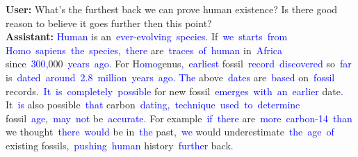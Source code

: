 \begin{tcolorbox}[colframe=gray!70!black,colback=white, title=Sample 5]
\textbf{User:}
What's the furthest back we can prove human existence? Is there good reason to believe it goes further then this point? \vspace{0.1in}
\\
\textbf{Assistant:}
\textcolor{blue}{Human} is an\textcolor{blue}{~ever}\textcolor{blue}{-ev}\textcolor{blue}{olving}\textcolor{blue}{~species}. If\textcolor{blue}{~we}\textcolor{blue}{~starts}\textcolor{blue}{~from} \textcolor{blue}{H}\textcolor{blue}{omo}\textcolor{blue}{~sapi}\textcolor{blue}{ens}\textcolor{blue}{~the}\textcolor{blue}{~species},\textcolor{blue}{~there} are\textcolor{blue}{~traces}\textcolor{blue}{~of}\textcolor{blue}{~human} in\textcolor{blue}{~Africa} since\textcolor{blue}{~}\textcolor{blue}{300}\textcolor{blue}{,}000\textcolor{blue}{~years}\textcolor{blue}{~ago}\textcolor{blue}{.} For H\textcolor{blue}{omo}genus\textcolor{blue}{,}\textcolor{blue}{~earliest} fossil\textcolor{blue}{~record}\textcolor{blue}{~discovered} so\textcolor{blue}{~far} is\textcolor{blue}{~dated}\textcolor{blue}{~around}\textcolor{blue}{~}\textcolor{blue}{2}\textcolor{blue}{.}\textcolor{blue}{8}\textcolor{blue}{~million}\textcolor{blue}{~years}\textcolor{blue}{~ago}\textcolor{blue}{.
}\textcolor{blue}{The} above\textcolor{blue}{~dates} are\textcolor{blue}{~based} on\textcolor{blue}{~fossil} records\textcolor{blue}{.}\textcolor{blue}{~It}\textcolor{blue}{~is}\textcolor{blue}{~completely}\textcolor{blue}{~possible} for new fossil\textcolor{blue}{~emerges}\textcolor{blue}{~with}\textcolor{blue}{~an}\textcolor{blue}{~earlier} date\textcolor{blue}{.} It\textcolor{blue}{~is} also possible\textcolor{blue}{~that} carbon\textcolor{blue}{~dating}\textcolor{blue}{,}\textcolor{blue}{~technique}\textcolor{blue}{~used}\textcolor{blue}{~to}\textcolor{blue}{~determine} fossil\textcolor{blue}{~age},\textcolor{blue}{~may}\textcolor{blue}{~not} be\textcolor{blue}{~accurate}\textcolor{blue}{.} For example\textcolor{blue}{~if}\textcolor{blue}{~there} are\textcolor{blue}{~more}\textcolor{blue}{~carbon}-\textcolor{blue}{14}\textcolor{blue}{~than} we thought\textcolor{blue}{~there}\textcolor{blue}{~would} be in\textcolor{blue}{~the} past\textcolor{blue}{,}\textcolor{blue}{~we} would underestimate\textcolor{blue}{~the}\textcolor{blue}{~age}\textcolor{blue}{~of} existing fossils,\textcolor{blue}{~pushing}\textcolor{blue}{~human} history\textcolor{blue}{~further} back\textcolor{blue}{.}\textcolor{blue}{}\textcolor{blue}{
}\vspace{0.1in}

\end{tcolorbox}
